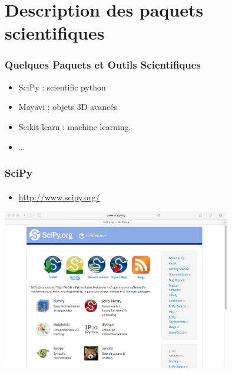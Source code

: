 \section{Description des paquets scientifiques}
\begin{frame}[fragile]
\frametitle{Quelques Paquets et Outils Scientifiques}
\begin{itemize}
 \item SciPy : scientific python 
 \item Mayavi : objets 3D avancés
 \item Scikit-learn : machine learning.
 \item \dots
\end{itemize}
\end{frame}
\begin{frame}[fragile]
\frametitle{SciPy}
\framesubtitle{}
\begin{itemize}
 \item \url{http://www.scipy.org/}
\end{itemize}
\begin{center}
\includegraphics[width=10cm]{./fig/scipy.png}
\end{center}
\end{frame}
